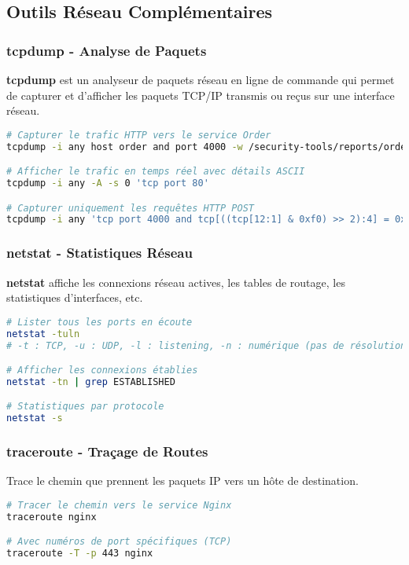 \subsection{Outils Réseau Complémentaires}

\subsubsection{tcpdump - Analyse de Paquets}
\textbf{tcpdump} est un analyseur de paquets réseau en ligne de commande qui permet de capturer et d'afficher les paquets TCP/IP transmis ou reçus sur une interface réseau.

\begin{lstlisting}[language=bash, caption=Exemples d'Utilisation de tcpdump]
# Capturer le trafic HTTP vers le service Order
tcpdump -i any host order and port 4000 -w /security-tools/reports/order-traffic.pcap

# Afficher le trafic en temps réel avec détails ASCII
tcpdump -i any -A -s 0 'tcp port 80'

# Capturer uniquement les requêtes HTTP POST
tcpdump -i any 'tcp port 4000 and tcp[((tcp[12:1] & 0xf0) >> 2):4] = 0x504F5354'
\end{lstlisting}

\subsubsection{netstat - Statistiques Réseau}
\textbf{netstat} affiche les connexions réseau actives, les tables de routage, les statistiques d'interfaces, etc.

\begin{lstlisting}[language=bash, caption=Analyse des Connexions avec netstat]
# Lister tous les ports en écoute
netstat -tuln
# -t : TCP, -u : UDP, -l : listening, -n : numérique (pas de résolution DNS)

# Afficher les connexions établies
netstat -tn | grep ESTABLISHED

# Statistiques par protocole
netstat -s
\end{lstlisting}

\subsubsection{traceroute - Traçage de Routes}
Trace le chemin que prennent les paquets IP vers un hôte de destination.

\begin{lstlisting}[language=bash, caption=Traçage de Route Réseau]
# Tracer le chemin vers le service Nginx
traceroute nginx

# Avec numéros de port spécifiques (TCP)
traceroute -T -p 443 nginx
\end{lstlisting}

